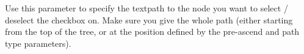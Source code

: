 
Use this parameter to specify the textpath to the node you want to select / deselect the checkbox on. Make sure you give the whole path (either starting from the top of the tree, or at the position defined by the pre-ascend and path type parameters).

